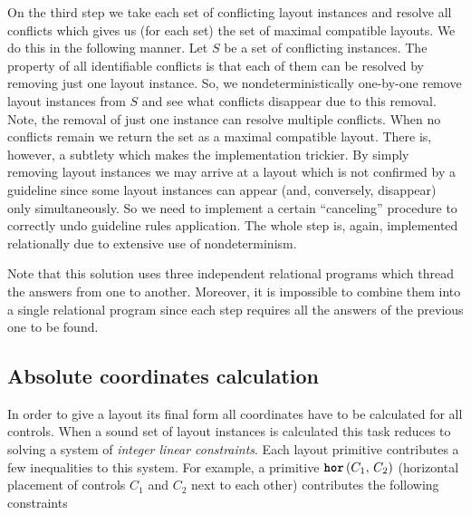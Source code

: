 On the third step we take each set of conflicting layout instances and resolve all conflicts which gives us (for each set)
the set of maximal compatible layouts. We do this in the following manner. Let $S$ be a set of conflicting
instances. The property of all identifiable conflicts is that each of them can be resolved by removing just
one layout instance. So, we nondeterministically one-by-one remove layout instances from $S$ and see what conflicts disappear
due to this removal. Note, the removal of just one instance can resolve multiple conflicts. When no conflicts remain we return
the set as a maximal compatible layout. There is, however, a subtlety which makes the implementation trickier. By simply removing
layout instances we may arrive at a layout which is not confirmed by a guideline since some layout instances can appear (and,
conversely, disappear) only simultaneously. So we need to implement a certain ``canceling'' procedure to correctly
undo guideline rules application. The whole step is, again, implemented relationally due to extensive use of
nondeterminism.



Note that this solution uses three independent relational programs which thread the answers from one to another.
Moreover, it is impossible to combine them into a single relational program since each step requires all the answers
of the previous one to be found.

\subsection{Absolute coordinates calculation}

In order to give a layout its final form all coordinates have to be calculated for all controls. When a sound set of
layout instances is calculated this task reduces to solving a system of \emph{integer linear constraints}. Each
layout primitive contributes a few inequalities to this system. For example, a primitive $\mbox{\texttt{\textbf{hor}}}\,(C_1,\,C_2)$ (horizontal
placement of controls $C_1$ and $C_2$ next to each other) contributes the following constraints

